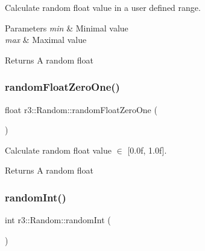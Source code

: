 Calculate random float value in a user defined range. 


\begin{DoxyParams}{Parameters}
{\em min} & Minimal value \\
\hline
{\em max} & Maximal value \\
\hline
\end{DoxyParams}
\begin{DoxyReturn}{Returns}
A random float 
\end{DoxyReturn}
\mbox{\label{classr3_1_1_random_af56217d8a7b64eec4fec0f4047e49075}} 
\subsubsection{\texorpdfstring{random\+Float\+Zero\+One()}{randomFloatZeroOne()}}
{\footnotesize\ttfamily float r3\+::\+Random\+::random\+Float\+Zero\+One (\begin{DoxyParamCaption}{ }\end{DoxyParamCaption})\hspace{0.3cm}{\ttfamily [static]}}



Calculate random float value $\in$ \mbox{[}0.\+0f, 1.\+0f\mbox{]}. 

\begin{DoxyReturn}{Returns}
A random float 
\end{DoxyReturn}
\mbox{\label{classr3_1_1_random_a72b76209864f485f539b6edccc434d9e}} 
\subsubsection{\texorpdfstring{random\+Int()}{randomInt()}\hspace{0.1cm}{\footnotesize\ttfamily [1/2]}}
{\footnotesize\ttfamily int r3\+::\+Random\+::random\+Int (\begin{DoxyParamCaption}{ }\end{DoxyParamCaption})\hspace{0.3cm}{\ttfamily [static]}}



